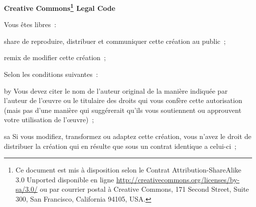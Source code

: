 \begin{center} 
  \textbf{\LARGE{Creative Commons\footnote{ Ce document est mis à
        disposition selon le Contrat Attribution-ShareAlike 3.0
        Unported disponible en ligne
        \url{http://creativecommons.org/licenses/by-sa/3.0/} ou par
        courrier postal à Creative Commons, 171 Second Street, Suite
        300, San Francisco, California 94105, USA.} Legal Code} }
\end{center}
\vspace{1cm}

\begin{lblock}{Vous êtes libres~:}

  \begin{pictonote}{share}
    de reproduire, distribuer et communiquer cette création au
    public~;
  \end{pictonote}

  \begin{pictonote}{remix}
    de modifier cette création~;
  \end{pictonote}

\end{lblock}
\begin{lblock}{Selon les conditions suivantes~:}
  
  \begin{pictonote}{by}
     Vous devez citer le nom de l'auteur
    original de la manière indiquée par l'auteur de l'œuvre ou le
    titulaire des droits qui vous confère cette autorisation (mais pas
    d'une manière qui suggérerait qu'ils vous soutiennent ou
    approuvent votre utilisation de l'œuvre)~;
  \end{pictonote}
  
  \begin{pictonote}{sa}
     Si
    vous modifiez, transformez ou adaptez cette création, vous n'avez
    le droit de distribuer la création qui en résulte que sous un
    contrat identique a celui-ci~;
  \end{pictonote}
  
\end{lblock}
